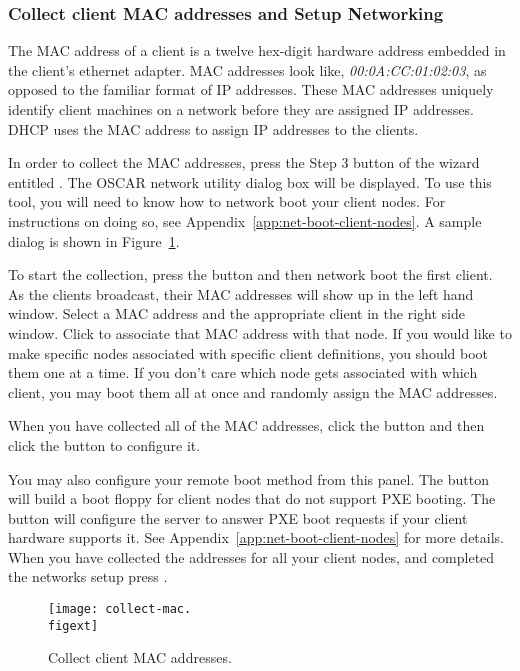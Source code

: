 \subsubsection{Collect client MAC addresses and Setup Networking} 
\label{det:setupnetwork}

The MAC address of a client
is a twelve hex-digit hardware address embedded in the client's
ethernet adapter. MAC addresses look like, \emph{00:0A:CC:01:02:03}, as
opposed to the familiar format of IP addresses. These MAC addresses
uniquely identify client machines on a network before they are
assigned IP addresses. DHCP uses the MAC address to assign IP 
addresses to the clients.

In order to collect the MAC addresses,  press the Step 3 button
of the wizard entitled . The
OSCAR network utility dialog box will be displayed.
To use this tool, you will need to know
how to network boot your client nodes.  For instructions on doing
so, see Appendix~\ref{app:net-boot-client-nodes}. A sample dialog
is shown in Figure~\ref{fig:detailed-collect-mac}. 

To start the collection, press the  button and then
network boot the first client.  As the clients broadcast, their MAC addresses
will show up in the left hand window. Select a MAC address and the appropriate
client in the right side window. Click  to 
associate that MAC address with that node. If you would like to make 
specific nodes associated with specific client definitions, you should
boot them one at a time. If you don't care which node gets associated
with which client, you may boot them all at once and randomly assign
the MAC addresses.

When you have collected all of the MAC addresses, click the 
button and then click the  button to configure it.
 
You may also configure your remote boot method from this panel. The
 button will build a boot floppy for
client nodes that do not support PXE booting. The  button will configure the server to answer PXE boot requests if
your client hardware supports it. See Appendix~\ref{app:net-boot-client-nodes}
for more details.
When you have collected the
addresses for all your client nodes, and completed the networks setup
press .

\begin{figure}[htbp]
  \begin{center}
    \texttt{[image: collect-mac.\\figext]}
    \caption{Collect client MAC addresses.}
    \label{fig:detailed-collect-mac}
  \end{center}
\end{figure}

